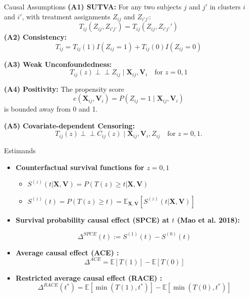 \begin{frame}{Causal Assumptions}
  \textbf{(A1) SUTVA:} 
  For any two subjects $j$ and $j'$ in clusters $i$ and $i'$, with treatment assignments $Z_{ij}$ and $Z_{i'j'}$:
          \[
          T_{ij}(Z_{ij}, Z_{i'j'}) = T_{ij}(Z_{ij}, Z_{i'j'}')
          \]
  \textbf{(A2) Consistency:} 
  \[
  T_{ij} = T_{ij}(1)I(Z_{ij}=1) + T_{ij}(0)I(Z_{ij}=0)
  \]

  
  \textbf{(A3) Weak Unconfoundedness:} 
  \[
  T_{ij}(z) \perp\!\!\!\perp Z_{ij}\mid \mathbf{X}_{ij},\mathbf{V}_i \quad \text{for } z=0,1
  \]
 
  
  \textbf{(A4) Positivity:} The propensity score 
  \[
  e(\mathbf{X}_{ij},\mathbf{V}_i)=P(Z_{ij}=1\mid \mathbf{X}_{ij},\mathbf{V}_i)
  \]
  is bounded away from 0 and 1.

  
  \textbf{(A5) Covariate-dependent Censoring:}
  \[
  T_{ij}(z) \perp\!\!\!\perp C_{ij}(z)\mid \mathbf{X}_{ij},\mathbf{V}_i,Z_{ij} \quad \text{for } z=0,1.
  \]
\end{frame}


\begin{frame}{Estimands}
    \begin{itemize}

\item \textbf{Counterfactual survival functions for $z = 0, 1$} 

\begin{itemize}
\item $S^{(z)}(t|\mathbf{X},\mathbf{V}) = P(T(z) \ge t | \mathbf{X},\mathbf{V})$
\item $S^{(z)}(t) = P(T(z) \ge t) = \mathbb{E}_{\mathbf{X},\mathbf{V}}[S^{(z)}(t|\mathbf{X},\mathbf{V})]$
\end{itemize}

\item \textbf{Survival probability causal effect (SPCE) at $t$ (Mao et al. 2018):} 

\[ \Delta^{SPCE}(t) := S^{(1)}(t) - S^{(0)}(t) \]


\item \textbf{Average causal effect (ACE) :} 
\[\Delta^{ACE} = \mathbb{E}[T(1)] - \mathbb{E}[T(0)] \]
\item \textbf{Restricted average causal effect (RACE) :}
\[\Delta^{RACE}(t^*) = \mathbb{E}[\min(T(1), t^*)] - \mathbb{E}[\min(T(0), t^*)] \]

\end{itemize}
\end{frame}


